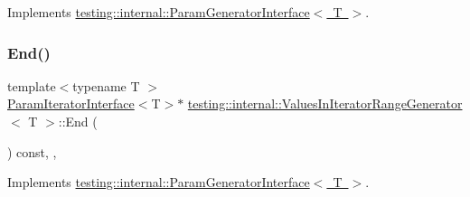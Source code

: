 Implements \mbox{\hyperlink{classtesting_1_1internal_1_1_param_generator_interface_afa7211b74990e11d3fc7ad4e7113da4f}{testing\+::internal\+::\+Param\+Generator\+Interface$<$ T $>$}}.

\mbox{\label{classtesting_1_1internal_1_1_values_in_iterator_range_generator_a298cfb66a90b1a39c0cea3ca7ae1ece1}} 
\subsubsection{\texorpdfstring{End()}{End()}\hspace{0.1cm}{\footnotesize\ttfamily [2/3]}}
{\footnotesize\ttfamily template$<$typename T $>$ \\
\mbox{\hyperlink{classtesting_1_1internal_1_1_param_iterator_interface}{Param\+Iterator\+Interface}}$<$T$>$$\ast$ \mbox{\hyperlink{classtesting_1_1internal_1_1_values_in_iterator_range_generator}{testing\+::internal\+::\+Values\+In\+Iterator\+Range\+Generator}}$<$ T $>$\+::End (\begin{DoxyParamCaption}{ }\end{DoxyParamCaption}) const\hspace{0.3cm}{\ttfamily [inline]}, {\ttfamily [override]}, {\ttfamily [virtual]}}



Implements \mbox{\hyperlink{classtesting_1_1internal_1_1_param_generator_interface_afa7211b74990e11d3fc7ad4e7113da4f}{testing\+::internal\+::\+Param\+Generator\+Interface$<$ T $>$}}.

\mbox{\label{classtesting_1_1internal_1_1_values_in_iterator_range_generator_a298cfb66a90b1a39c0cea3ca7ae1ece1}} 
